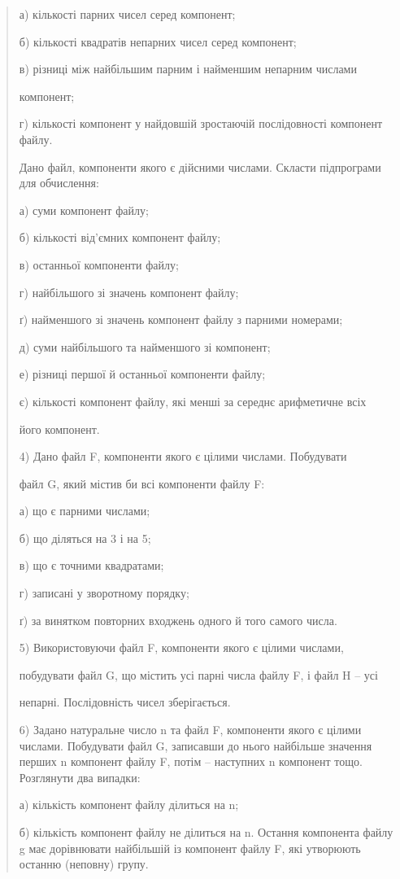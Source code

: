 \documentclass[]{article}
\begin{document}
\begin{quote}
а) кількості парних чисел серед компонент;

б) кількості квадратів непарних чисел серед компонент;

в) різниці між найбільшим парним і найменшим непарним числами

компонент;

г) кількості компонент у найдовшій зростаючій послідовності компонент
файлу.

Дано файл, компоненти якого є дійсними числами. Скласти підпрограми для
обчислення:

а) суми компонент файлу;

б) кількості від'ємних компонент файлу;

в) останньої компоненти файлу;

г) найбільшого зі значень компонент файлу;

ґ) найменшого зі значень компонент файлу з парними номерами;

д) суми найбільшого та найменшого зі компонент;

е) різниці першої й останньої компоненти файлу;

є) кількості компонент файлу, які менші за середнє арифметичне всіх

його компонент.

4) Дано файл F, компоненти якого є цілими числами. Побудувати

файл G, який містив би всі компоненти файлу F:

а) що є парними числами;

б) що діляться на 3 і на 5;

в) що є точними квадратами;

г) записані у зворотному порядку;

ґ) за винятком повторних входжень одного й того самого числа.

5) Використовуючи файл F, компоненти якого є цілими числами,

побудувати файл G, що містить усі парні числа файлу F, і файл H -- усі

непарні. Послідовність чисел зберігається.

6) Задано натуральне число n та файл F, компоненти якого є цілими
числами. Побудувати файл G, записавши до нього найбільше значення перших
n компонент файлу F, потім -- наступних n компонент тощо. Розглянути два
випадки:

а) кількість компонент файлу ділиться на n;

б) кількість компонент файлу не ділиться на n. Остання компонента файлу
g має дорівнювати найбільшій із компонент файлу F, які утворюють останню
(неповну) групу.


\end{quote}
\end{document}
